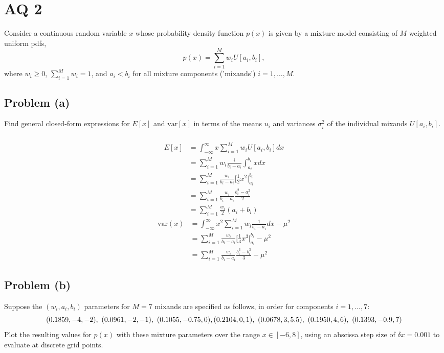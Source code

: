 \documentclass[11pt]{article}
\begin{document}
\section*{AQ 2}

Consider a continuous random variable $x$ whose probability density function $p(x)$ is given by a mixture model consisting of $M$ weighted uniform pdfs,
\begin{equation*}
	p(x) = \sum_{i=1}^Mw_iU[a_i,b_i],
\end{equation*}
where $w_i\geq0$, $\sum_{i=1}^Mw_i=1$, and $a_i<b_i$ for all mixture components ('mixands') $i=1,\dots,M$.

\subsection*{Problem (a)}
Find general closed-form expressions for $E[x]$ and $\text{var}[x]$ in terms of the means $u_i$ and variances $\sigma_i^2$ of the individual mixands $U[a_i,b_i]$.

\subparagraph*{}
\begin{align*}
	E[x]&=\int_{-\infty}^\infty x\sum_{i=1}^Mw_iU[a_i,b_i]dx \\
	&= \sum_{i=1}^Mw_i\frac{i}{b_i-a_i}\int_{a_i}^{b_i}xdx \\
	&= \sum_{i=1}^M\frac{w_i}{b_i-a_i}\Big[\frac{1}{2}x^2\Big|_{a_i}^{b_i} \\
	&= \sum_{i=1}^M\frac{w_i}{b_i-a_i}\frac{b_i^2-a_i^2}{2} \\
	&= \sum_{i=1}^M\frac{w_i}{2}(a_i+b_i)
\end{align*}
\begin{align*}
	\text{var}(x) &= \int_{-\infty}^\infty x^2\sum_{i=1}^Mw_i\frac{1}{b_i-a_i}dx-\mu^2 \\
	&= \sum_{i=1}^M\frac{w_i}{b_i-a_i}\Big[\frac{1}{3}x^3\Big|_{a_i}^{b_i}-\mu^2 \\
	&= \sum_{i=1}^M\frac{w_i}{b_i-a_i}\frac{b_i^3-b_i^3}{3}-\mu^2 
\end{align*}

\subsection*{Problem (b)}
Suppose the $(w_i,a_i,b_i)$ parameters for $M=7$ mixands are specified as follows, in order for components $i=1,\dots,7$:
\begin{equation*}
	(0.1859,-4,-2),\ (0.0961,-2,-1),\ (0.1055,-0.75,0), \\
	(0.2104,0,1),\ (0.0678,3,5.5),\ (0.1950,4,6),\ (0.1393,-0.9,7)
\end{equation*}
Plot the resulting values for $p(x)$ with these mixture parameters over the range $x\in[-6,8]$, using an abscissa step size of $\delta x=0.001$ to evaluate at discrete grid points.
\end{document}
